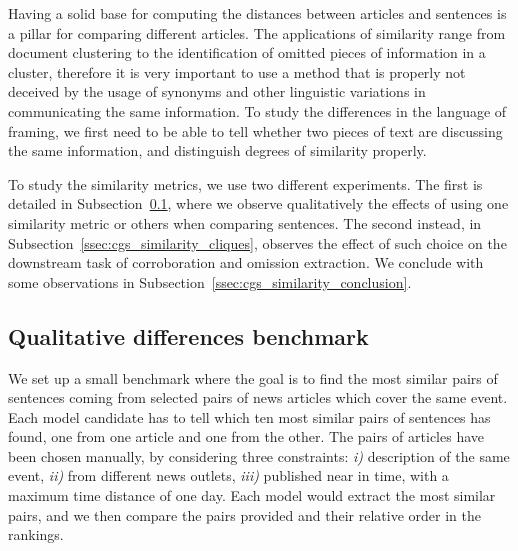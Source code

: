 Having a solid base for computing the distances between articles and sentences is a pillar for comparing different articles. The applications of similarity range from document clustering to the identification of omitted pieces of information in a cluster, therefore it is very important to use a method that is properly not deceived by the usage of synonyms and other linguistic variations in communicating the same information. To study the differences in the language of framing, we first need to be able to tell whether two pieces of text are discussing the same information, and distinguish degrees of similarity properly.

To study the similarity metrics, we use two different experiments. The first is detailed in Subsection~\ref{ssec:cgs_similarity_qualitative}, where we observe qualitatively the effects of using one similarity metric or others when comparing sentences. The second instead, in Subsection~\ref{ssec:cgs_similarity_cliques}, observes the effect of such choice on the downstream task of corroboration and omission extraction.
We conclude with some observations in Subsection~\ref{ssec:cgs_similarity_conclusion}.


\subsection{\statusgreen Qualitative differences benchmark}
\label{ssec:cgs_similarity_qualitative}
We set up a small benchmark where the goal is to find the most similar pairs of sentences coming from selected pairs of news articles which cover the same event. Each model candidate has to tell which ten most similar pairs of sentences has found, one from one article and one from the other.
The pairs of articles have been chosen manually, by considering three constraints: \textit{i)} description of the same event, \textit{ii)} from different news outlets, \textit{iii)} published near in time, with a maximum time distance of one day.
Each model would extract the most similar pairs, and we then compare the pairs provided and their relative order in the rankings.


